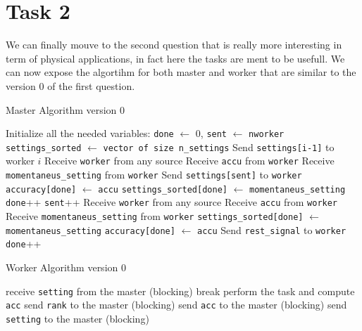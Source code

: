 \documentclass[a4paper]{article}
\theoremstyle{definition}
\theoremstyle{remark}
\begin{document}
\section*{Task 2}
We can finally mouve to the second question that is really more interesting in term of physical applications, in fact 
here the tasks are ment to be usefull.
We can now expose the algortihm for both master and worker that are similar to the version 0 of the first question.\\
\begin{minipage}{0.45\textwidth}
\begin{algorithm}[H]
\caption{Master Algorithm version 0}
\begin{algorithmic}[1]
\State Initialize all the needed variables: \texttt{done} $\gets$ 0, \texttt{sent} $\gets$ \texttt{nworker}
\State \texttt{settings\_sorted} $\gets$ \texttt{vector of size n\_settings}
    \State Send \texttt{settings[i-1]} to worker $i$
\EndFor
{}
    \State Receive \texttt{worker} from any source
    \State Receive \texttt{accu} from \texttt{worker}
    \State Receive \texttt{momentaneus\_setting} from \texttt{worker}
    \State Send \texttt{settings[sent]} to \texttt{worker}
    \State \texttt{accuracy[done]} $\gets$ \texttt{accu}
    \State \texttt{settings\_sorted[done]} $\gets$ \texttt{momentaneus\_setting}
    \State \texttt{done}++
    \State \texttt{sent}++
\EndWhile
{}
    \State Receive \texttt{worker} from any source
    \State Receive \texttt{accu} from \texttt{worker}
    \State Receive \texttt{momentaneus\_setting} from \texttt{worker}
    \State \texttt{settings\_sorted[done]} $\gets$ \texttt{momentaneus\_setting}
    \State \texttt{accuracy[done]} $\gets$ \texttt{accu}
    \State Send \texttt{rest\_signal} to \texttt{worker}
    \State \texttt{done}++
\EndFor
\end{algorithmic}
\end{algorithm}
\end{minipage}
\hfill
\begin{minipage}{0.45\textwidth}
\begin{algorithm}[H]
\caption{Worker Algorithm version 0}
\begin{algorithmic}[1]
    \State receive \texttt{setting} from the master (blocking)
        \State break
    \EndIf
    \State perform the task and compute \texttt{acc}
    \State send \texttt{rank} to the master (blocking)
    \State send \texttt{acc} to the master (blocking)
    \State send \texttt{setting} to the master (blocking)
\EndWhile
\end{algorithmic}
\end{algorithm}
\end{minipage}\\
\end{document}
